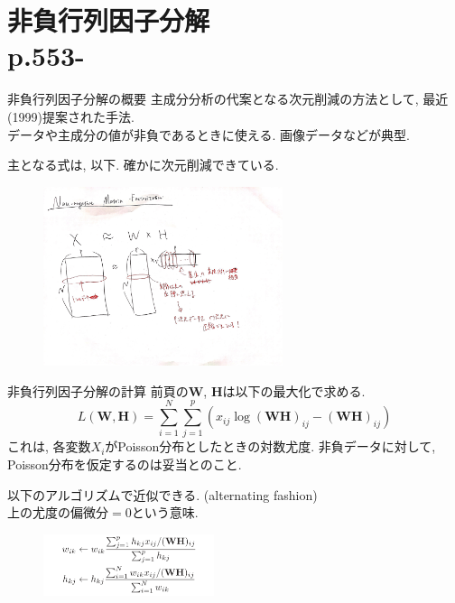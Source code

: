 \documentclass[dvipdfmx,8pt]{beamer}
\begin{document}
  \section{非負行列因子分解\\p.553-}
  \begin{frame}{非負行列因子分解の概要}
    主成分分析の代案となる次元削減の方法として, 最近(1999)提案された手法. \\
    データや主成分の値が非負であるときに使える. 画像データなどが典型.

    主となる式は, 以下. 確かに次元削減できている.
    \begin{figure}[htb]
      \centering
      \includegraphics[width=7cm,clip]{images/nmf-overview.jpg}
    \end{figure}
  \end{frame}
  \begin{frame}{非負行列因子分解の計算}
    前頁の$\mathbf{W}$, $\mathbf{H}$は以下の最大化で求める.
    \[
      L(\mathbf{W}, \mathbf{H})=\sum_{i=1}^N\sum_{j=1}^p\left(x_{ij}\log(\mathbf{WH})_{ij}-(\mathbf{WH})_{ij}\right)
    \]
    これは, 各変数$X_i$がPoisson分布としたときの対数尤度.
    非負データに対して, Poisson分布を仮定するのは妥当とのこと.

    以下のアルゴリズムで近似できる. (alternating fashion)\\
    上の尤度の偏微分$=0$という意味.
    \begin{figure}[htb]
      \centering
      \includegraphics[width=5cm,clip]{images/nnmf.png}
    \end{figure}
  \end{frame}
\end{document}
